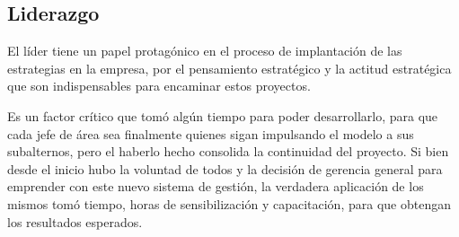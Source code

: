\subsection{Liderazgo}
\item {El líder tiene un papel protagónico en el proceso de implantación de las estrategias en la empresa, por el pensamiento estratégico y la actitud estratégica que son indispensables para encaminar estos proyectos.

Es un factor crítico que tomó algún tiempo para poder desarrollarlo, para que cada jefe de área sea finalmente quienes sigan impulsando el modelo a sus subalternos, pero el haberlo hecho consolida la continuidad del proyecto. Si bien desde el inicio hubo la voluntad de todos y la decisión de gerencia general para emprender con este nuevo sistema de gestión, la verdadera aplicación de los mismos tomó tiempo, horas de sensibilización y capacitación, para que obtengan los resultados esperados.}

